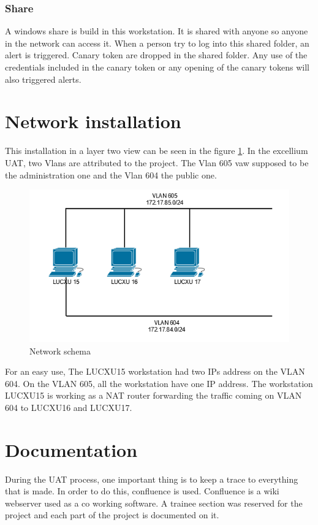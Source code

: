 \documentclass{tnreport}
\begin{document}
\subsubsection{Share}
A windows share is build in this workstation. It is shared with anyone so anyone in the network can access it. When a person try to log into this shared folder, an alert is triggered. Canary token are dropped in the shared folder. Any use of the credentials included in the canary token or any opening of the canary tokens will also triggered alerts.



\section{Network installation}
This installation in a layer two view can be seen in the figure \ref{fig:network_schem}. In the excellium UAT, two Vlans are attributed to the project. The Vlan 605 vaw supposed to be the administration one and the Vlan 604 the public one. 
\begin{figure}[h!]
  \begin{center}
  \includegraphics[width=\linewidth]{figures/network_schema}
  \caption{Network schema}
  \label{fig:network_schem}
  \end{center}
\end{figure}
For an easy use, The LUCXU15 workstation had two IPs address on the VLAN 604. On the VLAN 605, all the workstation have one IP address. The workstation LUCXU15 is working as a NAT router forwarding the traffic coming on VLAN 604 to LUCXU16 and LUCXU17.

\section{Documentation}
During the \gls{UAT} process, one important thing is to keep a trace to everything that is made. In order to do this, confluence is used. Confluence is a wiki webserver used as a co working software. A trainee section was reserved for the project and each part of the project is documented on it.
\end{document}
